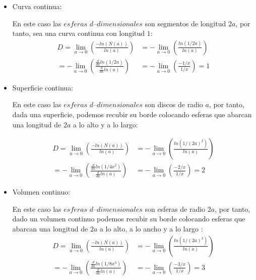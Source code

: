 \begin{itemize}
	\item Curva continua:
	
	En este caso las $esferas$ $d–dimensionales$ son segmentos de longitud $2a$, por tanto, sea una curva continua con longitud $1$:
	\begin{equation}
	\begin{split}
	D=\lim_{a\rightarrow 0}(\frac{-ln(N(a))}{ln(a)})
	&=-\lim_{a\rightarrow 0}(\frac{ln(1/2a)}{ln(a)})\\
	=-\lim_{a\rightarrow 0}(\frac{\frac{d}{da}ln(1/2a)}{\frac{d}{da}ln(a)})
	&=-\lim_{a\rightarrow 0}(\frac{-1/x}{1/x})=1
	\end{split}
	\end{equation}
	\item Superficie continua:
	
	En este caso las $esferas$ $d–dimensionales$ son discos de radio $a$, por tanto, dada una superficie, podemos recubir su borde colocando esferas que abarcan una longitud de $2a$ a lo alto y a lo largo:
	
	\begin{equation}
	\begin{split}
	D=\lim_{a\rightarrow 0}(\frac{-ln(N(a))}{ln(a)})
	&=-\lim_{a\rightarrow 0}(\frac{ln(1/(2a)^2)}{ln(a)})\\
	=-\lim_{a\rightarrow 0}(\frac{\frac{d}{da}ln(1/4x^2)}{\frac{d}{da}ln(a)})
	&=-\lim_{a\rightarrow 0}(\frac{-2/x}{1/x})=2
	\end{split}
	\end{equation}
	
	\item Volumen continuo:
	
	En este caso las $esferas$ $d–dimensionales$ son esferas de radio $2a$, por tanto, dado un volumen continuo podemos recubir su borde colocando esferas que abarcan una longitud de $2a$ a lo alto, a lo ancho y a lo largo :
	\begin{equation}
	\begin{split}
	D=\lim_{a\rightarrow 0}(\frac{-ln(N(a))}{ln(a)})
	&=-\lim_{a\rightarrow 0}(\frac{ln(1/(2a)^3)}{ln(a)})\\
	=-\lim_{a\rightarrow 0}(\frac{\frac{d}{da}ln(1/8x^3)}{\frac{d}{da}ln(a)})
	&=-\lim_{a\rightarrow 0}(\frac{-3/x}{1/x})=3
	\end{split}
	\end{equation}
\end{itemize}


